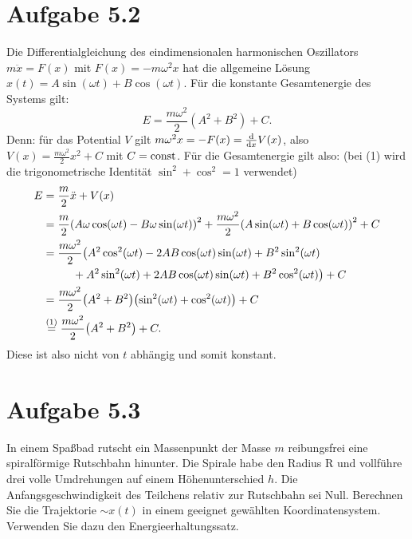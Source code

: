 \documentclass{theozettel}
\begin{document}
\section*{Aufgabe 5.2}
Die Differentialgleichung des eindimensionalen harmonischen Oszillators $m\ddot{x} = F(x)$ mit $F(x) = -m\omega^{2}x$ hat die allgemeine Lösung $x(t) = A\sin(\omega t) + B\cos(\omega t)$. Für die konstante Gesamtenergie des Systems gilt:
	\[
		E = \frac{m\omega^{2}}{2}(A^{2}+B^{2}) + C.
	\]
Denn: für das Potential $V$ gilt $m\omega^{2}x = -F(x) = \dv{x} V(x)$, also $V(x) = \frac{m\omega^{2}}{2}x^{2}+C$ mit $C = \operatorname{const}$. Für die Gesamtenergie gilt also: (bei (1) wird die trigonometrische Identität $\sin^{2} + \cos^{2} = 1$ verwendet)
	\begin{align*}
		E &= \frac{m}{2}\ddot{x} + V(x) \\
		&= \frac{m}{2}\qty(A\omega\cos(\omega t) - B\omega\sin(\omega t))^{2} + \frac{m\omega^{2}}{2}\qty(A\sin(\omega t) + B\cos(\omega t))^{2} + C \\
		&= \frac{m\omega^{2}}{2}\big(A^{2}\cos^{2}(\omega t) - 2AB\cos(\omega t)\sin(\omega t) + B^{2}\sin^{2}(\omega t) \\ & \ \ \ \ \ \ \ \ + A^{2}\sin^{2}(\omega t) + 2AB\cos(\omega t)\sin(\omega t) + B^{2}\cos^{2}(\omega t)\big) + C\\
		&= \frac{m\omega^{2}}{2}\qty(A^{2}+B^{2})\qty(\sin^{2}(\omega t) + \cos^{2}(\omega t)) + C\\
		&\stackrel{(1)}{=} \frac{m\omega^{2}}{2}\qty(A^{2}+B^{2}) + C.
	\end{align*}
Diese ist also nicht von $t$ abhängig und somit konstant. 


\newpage
\section*{Aufgabe 5.3}
In einem Spaßbad rutscht ein Massenpunkt der Masse $m$ reibungsfrei eine spiralförmige Rutschbahn hinunter. Die Spirale habe den Radius R und vollführe drei volle Umdrehungen auf einem
Höhenunterschied $h$. Die Anfangsgeschwindigkeit des Teilchens relativ zur Rutschbahn sei Null.
Berechnen Sie die Trajektorie $\sim x(t)$ in einem geeignet gewählten Koordinatensystem. Verwenden Sie dazu den Energieerhaltungssatz.
\end{document}

